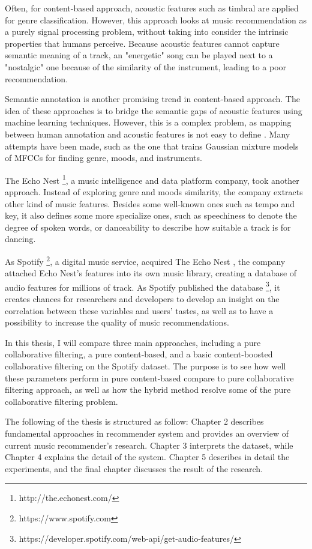 Often, for content-based approach, acoustic features such as timbral are applied for genre classification. However, this approach looks at music recommendation as a purely signal processing problem, without taking into consider the intrinsic properties that humans perceive. Because acoustic features cannot capture semantic meaning of a track, an "energetic" song can be played next to a "nostalgic" one because of the similarity of the instrument, leading to a poor recommendation.

Semantic annotation is another promising trend in content-based approach. The idea of these approaches is to bridge the semantic gaps of acoustic features using machine learning techniques. However, this is a complex problem, as mapping between human annotation and acoustic features is not easy to define \cite{aucouturier2009sounds}. Many attempts have been made, such as the one that trains Gaussian mixture models of MFCCs for finding genre, moods, and instruments. 

The Echo Nest \footnote{http://the.echonest.com/}, a music intelligence and data platform company, took another approach. Instead of exploring genre and moods similarity, the company extracts other kind of music features. Besides some well-known ones such as tempo and key, it also defines some more specialize ones, such as speechiness to denote the degree of spoken words, or danceability to describe how suitable a track is for dancing. 

As Spotify \footnote{https://www.spotify.com}, a digital music service, acquired The Echo Nest \cite{press_2014}, the company attached Echo Nest's features into its own music library, creating a database of audio features for millions of track. As Spotify published the database \footnote{https://developer.spotify.com/web-api/get-audio-features/}, it creates chances for researchers and developers to develop an insight on the correlation between these variables and users' tastes, as well as to have a possibility to increase the quality of music recommendations. 

In this thesis, I will compare three main approaches, including a pure collaborative filtering, a pure content-based, and a basic content-boosted collaborative filtering on the Spotify dataset. The purpose is to see how well these parameters perform in pure content-based compare to pure collaborative filtering approach, as well as how the hybrid method resolve some of the pure collaborative filtering problem. 

The following of the thesis is structured as follow: Chapter 2 describes fundamental approaches in recommender system and provides an overview of current music recommender's research. Chapter 3 interprets the dataset, while Chapter 4 explains the detail of the system. Chapter 5 describes in detail the experiments, and the final chapter discusses the result of the research. 




